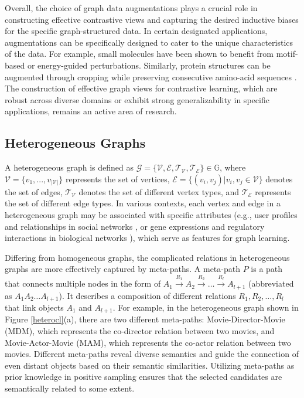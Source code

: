 \documentclass[11pt]{article}
\begin{document}
Overall, the choice of graph data augmentations plays a crucial role in constructing effective contrastive views and capturing the desired inductive biases for the specific graph-structured data. In certain designated applications, augmentations can be specifically designed to cater to the unique characteristics of the data. For example, small molecules have been shown to benefit from motif-based \cite{wang2022improving, fang2022molecular} or energy-guided \cite{liu2022molecular} perturbations. Similarly, protein structures can be augmented through cropping while preserving consecutive amino-acid sequences \cite{zhang2022protein, you2022cross}. The construction of effective graph views for contrastive learning, which are robust across diverse domains or exhibit strong generalizability in specific applications, remains an active area of research.

\subsection{Heterogeneous Graphs}
A heterogeneous graph is defined as $\mathcal{G} = \{\mathcal{V}, \mathcal{E}, \mathcal{T_V}, \mathcal{T_E}\} \in \mathbb{G}$, where $\mathcal{V} = \{v_1, ..., v_{|\mathcal{V}|}\}$ represents the set of vertices, $\mathcal{E} = \{(v_i, v_j) | v_i, v_j \in \mathcal{V}\}$ denotes the set of edges, $\mathcal{T_V}$ denotes the set of different vertex types, and $\mathcal{T_E}$ represents the set of different edge types. In various contexts, each vertex and edge in a heterogeneous graph may be associated with specific attributes (e.g., user profiles and relationships in social networks \cite{sun2012mining}, or gene expressions and regulatory interactions in biological networks \cite{peng2021end}), which serve as features for graph learning.

Differing from homogeneous graphs, the complicated relations in heterogeneous graphs are more effectively captured by meta-paths.
A meta-path \cite{sun2011pathsim, dong2017metapath2vec} $P$ is a path that connects multiple nodes in the form of $A_1\stackrel{R_1}{\longrightarrow} A_2 \stackrel{R_2}{\longrightarrow}\dots\stackrel{R_l}{\longrightarrow}A_{l+1}$ (abbreviated as $A_1A_2\dots A_{l+1}$). It describes a composition of different relations $R_1, R_2, \dots, R_l$ that link objects $A_1$ and $A_{l+1}$. For example, in the heterogeneous graph shown in Figure \ref{heterocl}(a), there are two different meta-paths: Movie-Director-Movie (MDM), which represents the co-director relation between two movies, and Movie-Actor-Movie (MAM), which represents the co-actor relation between two movies. Different meta-paths reveal diverse semantics and guide the connection of even distant objects based on their semantic similarities. Utilizing meta-paths as prior knowledge in positive sampling ensures that the selected candidates are semantically related to some extent.
\end{document}
